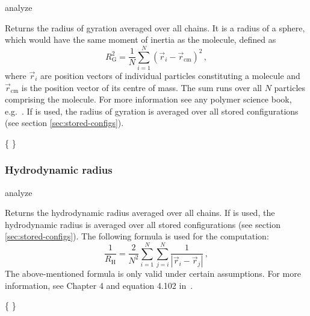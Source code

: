 \begin{essyntax}
  analyze  
\end{essyntax}
Returns the radius of gyration averaged over all chains. It is a radius
of a sphere, which would have the same moment of inertia as the molecule, 
defined as
\begin{equation}
\label{eq:Rg}
R_{\mathrm G}^2 = \frac{1}{N} \sum\limits_{i=1}^{N} \left(\vec r_i - \vec r_{\mathrm{cm}}\right)^2\,,
\end{equation}
where $\vec r_i$ are position vectors of individual particles constituting a molecule
and $\vec r_{\mathrm{cm}}$ is the position vector of its centre of mass. The sum runs
over all $N$ particles comprising the molecule. For more information see
any polymer science book, e.g.~\cite{rubinstein03a}.
If  is used, the radius of gyration is averaged over all stored
configurations (see section \vref{sec:stored-configs}).

\begin{code}
\{     \}
\end{code}

\subsubsection{Hydrodynamic radius}
\begin{essyntax}
  analyze  
\end{essyntax}
Returns the hydrodynamic radius averaged over all chains.  
If  is used, the hydrodynamic radius is averaged over all stored
configurations (see section \vref{sec:stored-configs}).
The following formula is used for the computation:
\begin{equation}
\label{eq:Rh}
\frac{1}{R_{\mathrm H}} = \frac{2}{N^2} \sum\limits_{i=1}^{N} \sum\limits_{j=i}^{N} \frac{1}{|\vec r_i - \vec r_j|}\,,
\end{equation}
The above-mentioned formula is only valid under certain assumptions.
For more information, see Chapter 4 and equation 4.102 in~\cite{doi86a}.
\begin{code}
\{   \}
\end{code}

